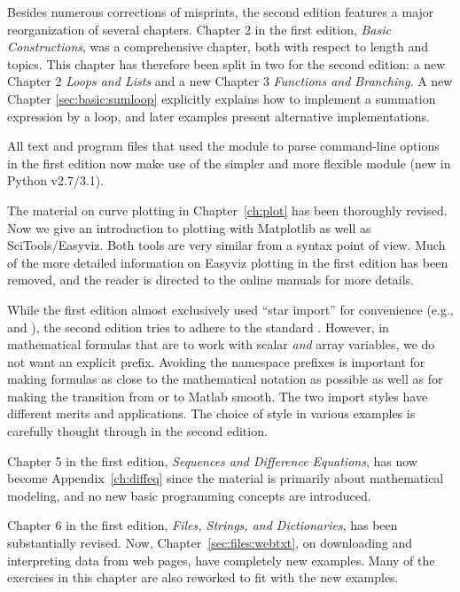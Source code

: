 Besides numerous corrections of misprints, the second edition features
a major reorganization of several chapters.
Chapter 2 in the first edition, \emph{Basic Constructions}, was a
comprehensive chapter, both with respect to length and topics.
This chapter has therefore
been split in two for the second edition: a new Chapter 2
\emph{Loops and Lists} and a new Chapter 3 \emph{Functions and Branching}.
A new Chapter
\ref{sec:basic:sumloop} explicitly explains how to implement
a summation expression by a loop,
and later examples present alternative implementations.

All text and program files that used the  module to parse
command-line options in the first edition now make use of the simpler
and more flexible  module (new in Python v2.7/3.1).

The material on curve plotting in Chapter~\ref{ch:plot} has been
thoroughly revised. Now we give an introduction to plotting with
Matplotlib as well as SciTools/Easyviz. Both tools are very similar from a
syntax point of view.  Much of the more detailed information on Easyviz
plotting in the first edition has been removed, and the reader is
directed to the online manuals for more details.

While the first edition almost exclusively
used ``star import'' for convenience (e.g., 
and ), the second edition tries to
adhere to the standard . However, in
mathematical formulas that are to work with scalar \emph{and} array
variables, we do not want an explicit prefix. Avoiding the namespace prefixes
is important for making formulas as close to the mathematical notation
as possible as well as for making the transition from or to Matlab
smooth. The two import styles have different merits and applications.
The choice of style in various examples is carefully thought through
in the second edition.

Chapter 5 in the first edition, \emph{Sequences and Difference Equations},
has now become Appendix~\ref{ch:diffeq}
since the material is primarily about mathematical modeling, and no
new basic programming concepts are introduced.

Chapter 6 in the first edition, \emph{Files, Strings, and Dictionaries},
has been substantially revised.
Now, Chapter~\ref{sec:files:webtxt}, on downloading and interpreting
data from web pages, have completely new examples. Many of the exercises in
this chapter are also reworked to fit with the new examples.

